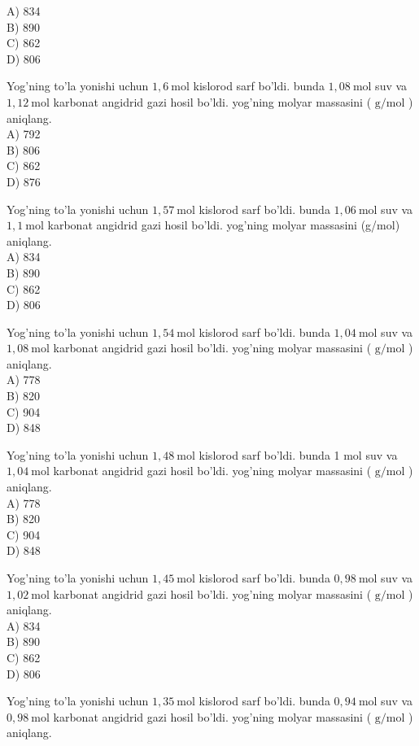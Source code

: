 A) 834\\
B) 890\\
C) 862\\
D) 806
  \item Yog'ning to'la yonishi uchun $1,6 \mathrm{~mol}$ kislorod sarf bo'ldi. bunda $1,08 \mathrm{~mol}$ suv va $1,12 \mathrm{~mol}$ karbonat angidrid gazi hosil bo'ldi. yog'ning molyar massasini ( $\mathrm{g} / \mathrm{mol}$ ) aniqlang.\\
A) 792\\
B) 806\\
C) 862\\
D) 876
  \item Yog'ning to'la yonishi uchun $1,57 \mathrm{~mol}$ kislorod sarf bo'ldi. bunda $1,06 \mathrm{~mol}$ suv va $1,1 \mathrm{~mol}$ karbonat angidrid gazi hosil bo'ldi. yog'ning molyar massasini (g/mol) aniqlang.\\
A) 834\\
B) 890\\
C) 862\\
D) 806
  \item Yog'ning to'la yonishi uchun $1,54 \mathrm{~mol}$ kislorod sarf bo'ldi. bunda $1,04 \mathrm{~mol}$ suv va $1,08 \mathrm{~mol}$ karbonat angidrid gazi hosil bo'ldi. yog'ning molyar massasini ( $\mathrm{g} / \mathrm{mol}$ ) aniqlang.\\
A) 778\\
B) 820\\
C) 904\\
D) 848
  \item Yog'ning to'la yonishi uchun $1,48 \mathrm{~mol}$ kislorod sarf bo'ldi. bunda 1 mol suv va $1,04 \mathrm{~mol}$ karbonat angidrid gazi hosil bo'ldi. yog'ning molyar massasini ( $\mathrm{g} / \mathrm{mol}$ ) aniqlang.\\
A) 778\\
B) 820\\
C) 904\\
D) 848
  \item Yog'ning to'la yonishi uchun $1,45 \mathrm{~mol}$ kislorod sarf bo'ldi. bunda $0,98 \mathrm{~mol}$ suv va $1,02 \mathrm{~mol}$ karbonat angidrid gazi hosil bo'ldi. yog'ning molyar massasini ( $\mathrm{g} / \mathrm{mol}$ ) aniqlang.\\
A) 834\\
B) 890\\
C) 862\\
D) 806
  \item Yog'ning to'la yonishi uchun $1,35 \mathrm{~mol}$ kislorod sarf bo'ldi. bunda $0,94 \mathrm{~mol}$ suv va $0,98 \mathrm{~mol}$ karbonat angidrid gazi hosil bo'ldi. yog'ning molyar massasini ( $\mathrm{g} / \mathrm{mol}$ ) aniqlang.\\
